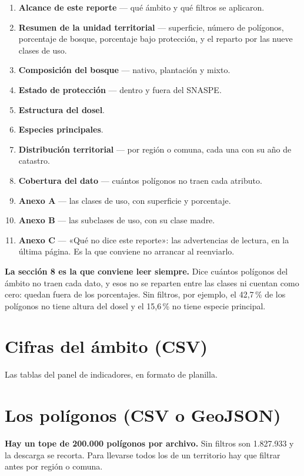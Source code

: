 \documentclass[11pt,a4paper]{report}
\newcommand{\campo}[1]{\textcolor{conaf}{\textbf{#1}}}
\begin{document}
\begin{enumerate}[itemsep=1pt]
  \item \campo{Alcance de este reporte} — qué ámbito y qué filtros se aplicaron.
  \item \campo{Resumen de la unidad territorial} — superficie, número de
        polígonos, porcentaje de bosque, porcentaje bajo protección, y el
        reparto por las nueve clases de uso.
  \item \campo{Composición del bosque} — nativo, plantación y mixto.
  \item \campo{Estado de protección} — dentro y fuera del SNASPE.
  \item \campo{Estructura del dosel}.
  \item \campo{Especies principales}.
  \item \campo{Distribución territorial} — por región o comuna, cada una con su
        año de catastro.
  \item \campo{Cobertura del dato} — cuántos polígonos no traen cada atributo.
  \item[] \campo{Anexo A} — las clases de uso, con superficie y porcentaje.
  \item[] \campo{Anexo B} — las subclases de uso, con su clase madre.
  \item[] \campo{Anexo C} — «Qué no dice este reporte»: las advertencias de
        lectura, en la última página. Es la que conviene no arrancar al
        reenviarlo.
\end{enumerate}

\begin{nota}
\campo{La sección 8 es la que conviene leer siempre.} Dice cuántos polígonos
del ámbito no traen cada dato, y esos no se reparten entre las clases ni cuentan
como cero: quedan fuera de los porcentajes. Sin filtros, por ejemplo, el
42,7\,\% de los polígonos no tiene altura del dosel y el 15,6\,\% no tiene
especie principal.
\end{nota}

\section{Cifras del ámbito (CSV)}
Las tablas del panel de indicadores, en formato de planilla.

\section{Los polígonos (CSV o GeoJSON)}

\begin{alerta}
\campo{Hay un tope de 200.000 polígonos por archivo.} Sin filtros son 1.827.933
y la descarga se recorta. Para llevarse todos los de un territorio hay que
filtrar antes por región o comuna.
\end{alerta}
\end{document}
